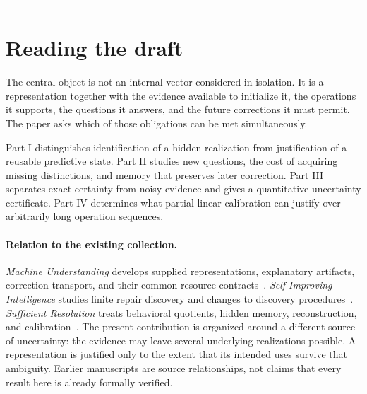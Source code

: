 \documentclass[11pt,letterpaper]{article}
\theoremstyle{plain}
\theoremstyle{definition}
\begin{document}
\begin{titlepage}
\vfill
\noindent\rule{\textwidth}{.4pt}\par\smallskip
{}
\end{titlepage}
\hypersetup{pageanchor=true}
\begingroup\small\setlength{\parskip}{0pt}\tableofcontents\endgroup
\clearpage
\section*{Reading the draft}
The central object is not an internal vector considered in isolation. It is a representation together with the evidence available to initialize it, the operations it supports, the questions it answers, and the future corrections it must permit. The paper asks which of those obligations can be met simultaneously.

Part I distinguishes identification of a hidden realization from justification of a reusable predictive state. Part II studies new questions, the cost of acquiring missing distinctions, and memory that preserves later correction. Part III separates exact certainty from noisy evidence and gives a quantitative uncertainty certificate. Part IV determines what partial linear calibration can justify over arbitrarily long operation sequences.

\paragraph{Relation to the existing collection.}
\emph{Machine Understanding} develops supplied representations, explanatory artifacts, correction transport, and their common resource contracts~\cite{understanding}. \emph{Self-Improving Intelligence} studies finite repair discovery and changes to discovery procedures~\cite{selfimproving}. \emph{Sufficient Resolution} treats behavioral quotients, hidden memory, reconstruction, and calibration~\cite{resolution}. The present contribution is organized around a different source of uncertainty: the evidence may leave several underlying realizations possible. A representation is justified only to the extent that its intended uses survive that ambiguity. Earlier manuscripts are source relationships, not claims that every result here is already formally verified.
\end{document}
